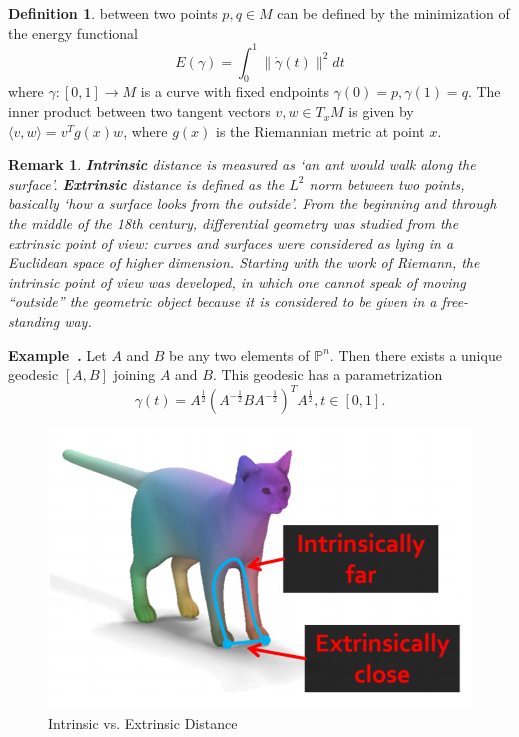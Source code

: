 \documentclass[a4paper]{article}
\theoremstyle{definition}
\newtheorem{definition}{Definition}
\theoremstyle{plain}
\newtheorem{remark}{Remark}
\newcounter{example}{Example}
\newenvironment{example}[1][]{\refstepcounter{example}\par\medskip
   \noindent \textbf{Example~\theexample. #1} \rmfamily}{\medskip}
\begin{document}
\begin{definition}
 between two points $p,q\in M$ can be defined by the minimization of the energy functional
\begin{equation*}
    E(\gamma)=\int^1_0\|\Dot{\gamma}(t)\|^2dt
\end{equation*}
where $\gamma:[0,1]\rightarrow M$ is a curve with fixed endpoints $\gamma(0)=p, \gamma(1)=q$. The inner product between two tangent vectors $v,w\in T_xM$ is given by $\langle v,w\rangle=v^Tg(x)w$, where $g(x)$ is the Riemannian metric at point $x$.
\end{definition}

\begin{remark}\cite{stanford2}
\textbf{Intrinsic} distance is measured as ‘an ant would walk along the surface’. \textbf{Extrinsic} distance is defined as the $L^2$ norm between two points, basically ‘how a surface looks from the outside’. From the beginning and through the middle of the 18th century, differential geometry was studied from the extrinsic point of view: curves and surfaces were considered as lying in a Euclidean space of higher dimension. Starting with the work of Riemann, the intrinsic point of view was developed, in which one cannot speak of moving ``outside'' the geometric object because it is considered to be given in a free-standing way.
\end{remark}

\begin{example}\cite{bhatia}
Let $A$ and $B$ be any two elements of $\mathbb{P}^n$. Then there exists a unique geodesic $[A,B]$ joining $A$ and $B$. This geodesic has a parametrization
\begin{equation*}
    \gamma(t)=A^{\frac{1}{2}}(A^{-\frac{1}{2}}BA^{-\frac{1}{2}})^TA^{\frac{1}{2}}, t\in[0,1].
\end{equation*}
\end{example}

\begin{figure}[H]
   \centering
   \includegraphics[scale=0.4]{figure/intrinsic.png}
   \caption{Intrinsic vs. Extrinsic Distance}
\end{figure}
\end{document}
